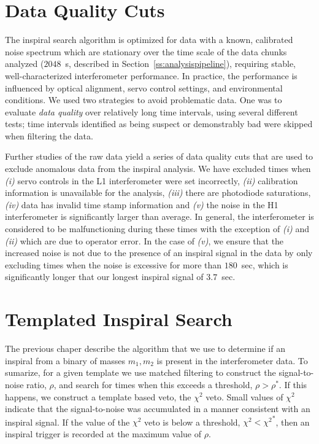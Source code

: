 \section{Data Quality Cuts}
\label{s:dq}

The inspiral search algorithm is optimized for data with a known,
calibrated noise spectrum which are stationary over the time scale of
the data chunks analyzed ($2048$~s, described in
Section~\ref{ss:analysispipeline}), requiring stable,
well-characterized interferometer performance.  In practice, the
performance is influenced by optical alignment, servo control
settings, and environmental conditions.  We used two strategies to
avoid problematic data.  One was to evaluate {\it data quality} over
relatively long time intervals, using several different tests; time
intervals identified as being suspect or demonstrably bad were skipped
when filtering the data.

Further studies of the raw data yield a series of data quality cuts
that are used to exclude anomalous data from the inspiral
analysis\cite{gwdawveto}. We have excluded times when \emph{(i)} servo
controls in the L1 interferometer were set incorrectly, \emph{(ii)}
calibration information is unavailable for the analysis, \emph{(iii)} there
are photodiode saturations, \emph{(iv)} data has invalid time stamp
information and \emph{(v)} the noise in the H1 interferometer is significantly
larger than average. In general, the interferometer is considered to be
malfunctioning during these times with the exception of \emph{(i)} and
\emph{(ii)} which are due to operator error. In the case of \emph{(v)}, we
ensure that the increased noise is not due to the presence of an inspiral
signal in the data by only excluding times when the noise is excessive for
more than $180$~sec, which is significantly longer that our longest inspiral
signal of $3.7$~sec.

\section{Templated Inspiral Search}
\label{s:pipetemplate}

The previous chaper describe the algorithm that we use to determine if an
inspiral from a binary of masses ${m_1,m_2}$ is present in the interferometer
data. To sumarize, for a given template we use matched filtering to construct
the signal-to-noise ratio, $\rho$, and search for times when this exceeds a
threshold, $\rho > \rho^\ast$. If this happens, we construct a template based
veto, the $\chi^2$ veto\cite{brucechisq}. Small values of $\chi^2$ indicate
that the signal-to-noise was accumulated in a manner consistent with an
inspiral signal. If the value of the $\chi^2$ veto is below a threshold,
$\chi^2 < {\chi^2}^\ast$, then an inspiral trigger is recorded at the maximum
value of $\rho$.

